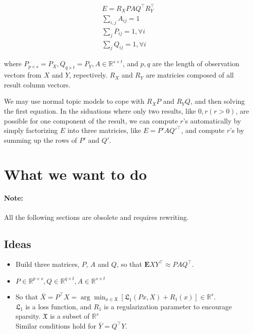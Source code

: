 \documentclass[12pt]{article}
\begin{document}
\begin{eqnarray}
E = R_X P A Q^\top R_Y^\top \\
\sum_{i,j} A_{ij} = 1 \\
\sum_{j} P_{ij} = 1, \forall i \\
\sum_{j} Q_{ij} = 1, \forall i
\end{eqnarray}

where $P_{p \times s} = P_X, Q_{q \times t} = P_Y, A \in \mathbb{R}^{s \times t}$, and $p, q$ are the length of observation vectors from $X$ and $Y$, repectively. $R_X$ and $R_Y$ are matricies composed of all result column vectors.

We may use normal topic models to cope with $R_X P$ and $R_Y Q$, and then solving the first equation. In the siduations where only two results, like ${0, r} (r>0)$, are possible for one component of the result, we can compute $r$'s automatically by simply factorizing $E$ into three matricies, like $E = P' A Q'^\top$, and compute $r$'s by summing up the rows of $P'$ and $Q'$.

\section{What we want to do}
\paragraph{Note:} All the following sections are obsolete and requires rewriting.
\subsection{Ideas}
\begin{itemize}
\item Build three matrices, $P$, $A$ and $Q$, so that $\textbf{E}XY^\top \approx PAQ^\top$.
\item $P \in \mathbb{R}^{p \times s}, Q \in \mathbb{R}^{q \times t}, A \in \mathbb{R}^{s \times t}$
\item So that $\bar{X} = P^\top X = \arg \min_{x \in \mathfrak{X}}{[\mathfrak{L}_1(Px, X) + R_1(x)] \in \mathbb{R}^s}$. \\
	$\mathfrak{L}_1$ is a loss function, and $R_1$ is a regularization parameter to encourage sparsity. $\mathfrak{X}$ is a subset of $\mathbb{R}^s$ \\
	Similar conditions hold for $\bar{Y} = Q^\top Y$.
\end{itemize}
\end{document}
